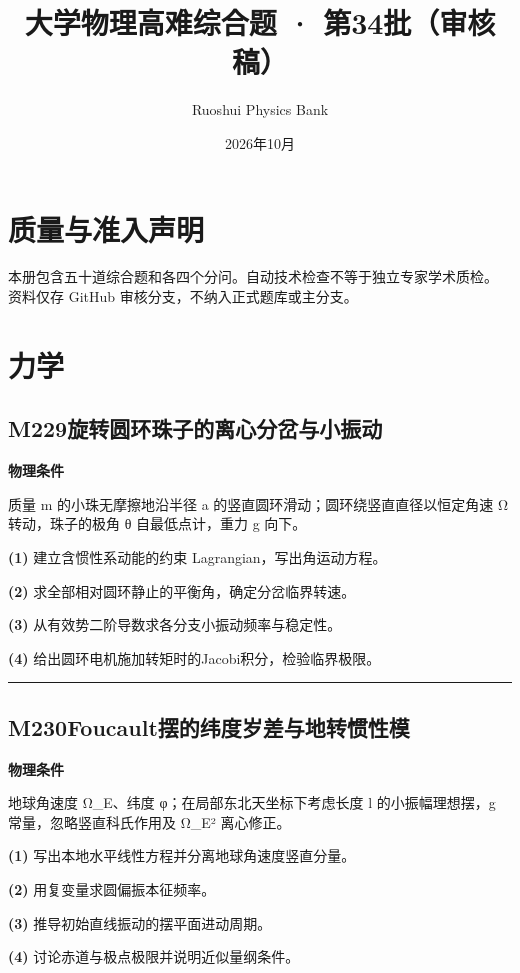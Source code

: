 \documentclass[UTF8,a4paper,11pt,oneside,openany]{ctexbook}
\begin{document}
\title{大学物理高难综合题 · 第34批（审核稿）}
\author{Ruoshui Physics Bank}
\date{2026年10月}
\maketitle
\tableofcontents
\chapter*{质量与准入声明}
本册包含五十道综合题和各四个分问。自动技术检查不等于独立专家学术质检。
资料仅存 GitHub 审核分支，不纳入正式题库或主分支。

\chapter{力学}
\section*{M229\quad 旋转圆环珠子的离心分岔与小振动}
\textbf{物理条件}\par 质量 m 的小珠无摩擦地沿半径 a 的竖直圆环滑动；圆环绕竖直直径以恒定角速 Ω 转动，珠子的极角 θ 自最低点计，重力 g 向下。
\par\noindent\textbf{(1)} 建立含惯性系动能的约束 Lagrangian，写出角运动方程。
\par\noindent\textbf{(2)} 求全部相对圆环静止的平衡角，确定分岔临界转速。
\par\noindent\textbf{(3)} 从有效势二阶导数求各分支小振动频率与稳定性。
\par\noindent\textbf{(4)} 给出圆环电机施加转矩时的Jacobi积分，检验临界极限。

\par\bigskip\hrule\bigskip
\section*{M230\quad Foucault摆的纬度岁差与地转惯性模}
\textbf{物理条件}\par 地球角速度 Ω\_E、纬度 φ；在局部东北天坐标下考虑长度 l 的小振幅理想摆，g 常量，忽略竖直科氏作用及 Ω\_E² 离心修正。
\par\noindent\textbf{(1)} 写出本地水平线性方程并分离地球角速度竖直分量。
\par\noindent\textbf{(2)} 用复变量求圆偏振本征频率。
\par\noindent\textbf{(3)} 推导初始直线振动的摆平面进动周期。
\par\noindent\textbf{(4)} 讨论赤道与极点极限并说明近似量纲条件。
\end{document}
